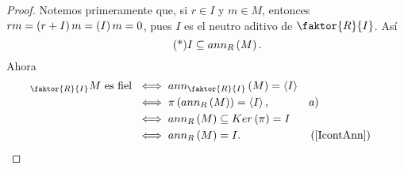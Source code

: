 \documentclass{article}
\begin{document}
\begin{enumerate}[label=\textbf{Ej \arabic*.}]
\begin{proof}
			 Notemos primeramente que, si $r\in I$ y $m\in M$, entonces $rm=\left(r+I\right)m=\left(I\right)m=0$, pues $I$ es el neutro aditivo de $\faktor{R}{I}$. Así \begin{equation*}\tag{*}\label{IcontAnn}
				I\subseteq ann_R\left(M\right).
			\end{equation*}
			Ahora
			\begin{align*}
				\ringmod{\faktor{R}{I}}{M}{l}\text{ es fiel }&\iff ann_{\faktor{R}{I}}\lrprth{M}=\gengroup{I}\\
				&\iff \pi\lrprth{ann_R\lrprth{M}}=\gengroup{I}, && a)\\
				&\iff ann_R\lrprth{M}\subseteq Ker\lrprth{\pi}=I\\
				&\iff ann_R\lrprth{M}=I. && \lrprth{\text{\ref{IcontAnn}}}
			\end{align*}
		\end{proof}
		

\end{enumerate}
\end{document}
